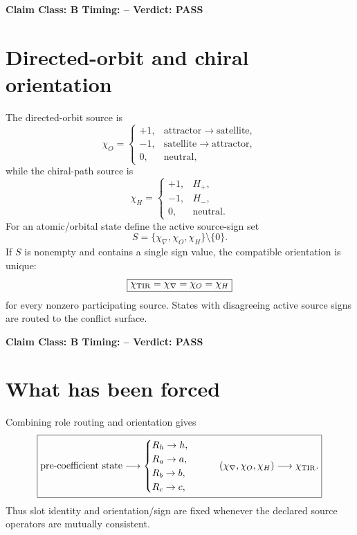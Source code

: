\documentclass[11pt,a4paper,twoside]{book}
\theoremstyle{definition}
\newcommand{\vTwelveStatus}[3]{\par\noindent\textbf{Claim Class: #1 \quad Timing: #2 \quad Verdict: #3}\par}
\begin{document}
\vTwelveStatus{B}{--}{PASS}

\section{Directed-orbit and chiral orientation}
The directed-orbit source is
\begin{equation}
\chi_O=
\begin{cases}
+1,&\text{attractor}\to\text{satellite},\\
-1,&\text{satellite}\to\text{attractor},\\
0,&\text{neutral},
\end{cases}
\label{eq:v12-orbit-orientation}
\end{equation}
while the chiral-path source is
\begin{equation}
\chi_H=
\begin{cases}
+1,&H_+,\\
-1,&H_-,\\
0,&\text{neutral}.
\end{cases}
\label{eq:v12-chiral-orientation}
\end{equation}
For an atomic/orbital state define the active source-sign set
\[
S=\{\chi_\nabla,\chi_O,\chi_H\}\setminus\{0\}.
\]
If $S$ is nonempty and contains a single sign value, the compatible orientation
is unique:
\begin{equation}
\boxed{
\chi_{\rm TIR}=\chi_\nabla=\chi_O=\chi_H
}
\label{eq:v12-consensus-orientation}
\end{equation}
for every nonzero participating source. States with disagreeing active source
signs are routed to the conflict surface.

\vTwelveStatus{B}{--}{PASS}

\section{What has been forced}
Combining role routing and orientation gives
\begin{equation}
\boxed{
\text{pre-coefficient state}
\longrightarrow
\begin{cases}
R_h\to h,\\
R_a\to a,\\
R_b\to b,\\
R_c\to c,
\end{cases}
\qquad
(\chi_\nabla,\chi_O,\chi_H)
\longrightarrow\chi_{\rm TIR}.
}
\label{eq:v12-coefficient-forcing-chain}
\end{equation}
Thus slot identity and orientation/sign are fixed whenever the declared source
operators are mutually consistent.
\end{document}

